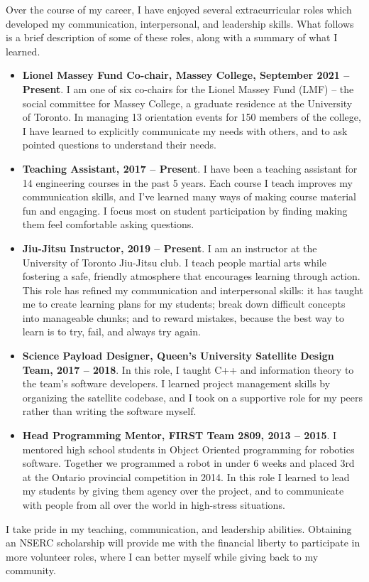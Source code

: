\documentclass[a4paper,12pt]{article}
\begin{document}
Over the course of my career, I have enjoyed several extracurricular roles which
developed my communication, interpersonal, and leadership skills.
What follows is a brief description of some of these roles, along with a summary
of what I learned.
\begin{itemize}
\item \textbf{Lionel Massey Fund Co-chair, Massey College, September 2021 -- Present}.
    I am one of six co-chairs for the Lionel Massey Fund (LMF) -- the social
    committee for Massey College, a graduate residence at the University of
    Toronto.
    In managing 13 orientation events for 150 members of the college, I have
    learned to explicitly communicate my needs with others, and to ask pointed
    questions to understand their needs.

\item \textbf{Teaching Assistant, 2017 -- Present}.
    I have been a teaching assistant for 14 engineering courses in the past 5 years.
    Each course I teach improves my communication skills, and I've learned
    many ways of making course material fun and engaging.
    I focus most on student participation by finding making them feel
    comfortable asking questions. 

\item \textbf{Jiu-Jitsu Instructor, 2019 -- Present}. 
    I am an instructor at the University of Toronto Jiu-Jitsu club. I teach
    people martial arts while fostering a safe, friendly atmosphere that
    encourages learning through action.
    This role has refined my communication and interpersonal skills:
    it has taught me to create learning plans for my students;
    break down difficult concepts into manageable chunks; 
    and to reward mistakes, because the best way to learn is to try, fail, and
    always try again.

\item \textbf{Science Payload Designer, Queen’s University Satellite Design
    Team, 2017 -- 2018}. 
    In this role, I taught C++ and information theory to the team’s software
    developers. I learned project management skills by organizing
    the satellite codebase, and I took on a supportive role for my peers rather
    than writing the software myself.

\item \textbf{Head Programming Mentor, FIRST Team 2809, 2013 -- 2015}. 
    I mentored high school students in Object Oriented programming for robotics
    software. Together we programmed a robot in under 6 weeks and placed 3rd at
    the Ontario provincial competition in 2014.
    In this role I learned to lead my students by giving them agency over the
    project, and to communicate with people from all over the world in
    high-stress situations.

\end{itemize}

I take pride in my teaching, communication, and leadership abilities.
Obtaining an NSERC scholarship will provide me with the financial liberty to
participate in more volunteer roles, where I can better myself while giving back to my
community.
\end{document}
